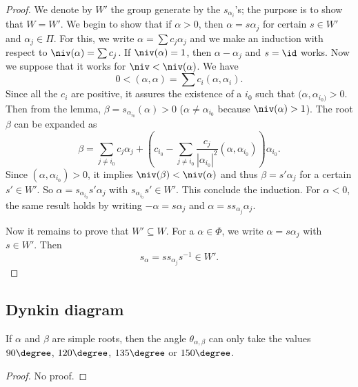 \begin{proof}
We denote by $W'$ the group generate by the $s_{\alpha_i}$'s; the purpose is to show that $W=W'$. We begin to show that if $\alpha>0$, then $\alpha=s\alpha_j$ for certain $s\in W'$ and $\alpha_j\in\Pi$. For this, we write $\alpha=\sum c_j\alpha_j$ and we make an induction with respect to $\niv(\alpha)=\sum c_j$. If $\niv(\alpha)=1$, then $\alpha-\alpha_j$ and $s=\id$ works.  Now we suppose that it works for $\niv<\niv(\alpha)$. We have
\[
   0<(\alpha,\alpha)=\sum c_i(\alpha,\alpha_i).
\]
Since all the $c_i$ are positive, it assures the existence of a $i_0$ such that $(\alpha,\alpha_{i_0)}>0$. Then from the lemma, $\beta=s_{\alpha_{i_0}}(\alpha)>0$ ($\alpha\neq \alpha_{i_0}$ because $\niv(\alpha)>1$). The root $\beta$ can be expanded as
\begin{equation}
\beta=\sum_{j \neq i_0}c_j\alpha_j+\left(  c_{i_0}-\sum_{j\neq i_0}\frac{c_j}{|\alpha_{i_0}|^2}(\alpha,\alpha_{i_0})   \right)\alpha_{i_0}.
\end{equation}
Since $(\alpha,\alpha_{i_0})>0$, it implies $\niv(\beta)<\niv(\alpha)$ and thus $\beta=s'\alpha_j$ for a certain $s'\in W'$. So $\alpha=s_{\alpha_{i_0}}s'\alpha_j$ with $s_{\alpha_{i_0}}s'\in W'$. This conclude the induction. For $\alpha<0$, the same result holds by writing $-\alpha=s\alpha_j$ and $\alpha=ss_{\alpha_j}\alpha_j$.

Now it remains to prove that $W'\subseteq W$. For a $\alpha\in\Phi$, we write $\alpha=s\alpha_j$ with $s\in W'$. Then
\[
   s_{\alpha}=ss_{\alpha_j}s^{-1}\in W'.
\]
\end{proof}


                    \subsection{Dynkin diagram}

\begin{proposition}
    If $\alpha$ and $\beta$ are simple roots, then the angle $\theta_{\alpha,\beta}$ can only take the values $90\degree$, $120\degree$, $135\degree$ or $150\degree$.
\end{proposition}
\begin{proof}
    No proof.
\end{proof}

